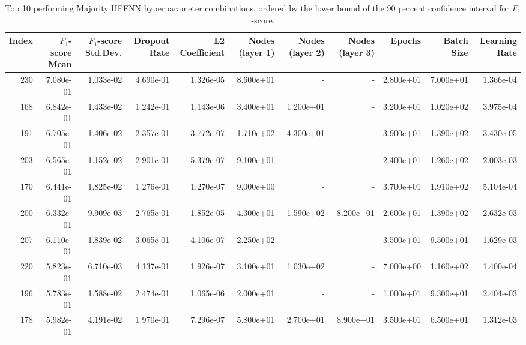 \begin{table}
\caption{Top 10 performing Majority HFFNN hyperparameter combinations, ordered by the lower bound of the 90 percent confidence interval for $F_1$-score.}
\label{tab:appendix_best_majority_hffnn_hpars}
\begin{adjustbox}{width=1\textwidth}
\begin{tabular}{rrrrrrrrrrr}
\toprule
Index & $F_1$-score Mean & $F_1$-score Std.Dev. & Dropout Rate & L2 Coefficient & Nodes (layer 1) & Nodes (layer 2) & Nodes (layer 3) & Epochs & Batch Size & Learning Rate \\
\midrule
230 & 7.080e-01 & 1.033e-02 & 4.690e-01 & 1.326e-05 & 8.600e+01 & - & - & 2.800e+01 & 7.000e+01 & 1.366e-04 \\
168 & 6.842e-01 & 1.433e-02 & 1.242e-01 & 1.143e-06 & 3.400e+01 & 1.200e+01 & - & 3.200e+01 & 1.020e+02 & 3.975e-04 \\
191 & 6.705e-01 & 1.406e-02 & 2.357e-01 & 3.772e-07 & 1.710e+02 & 4.300e+01 & - & 3.900e+01 & 1.390e+02 & 3.430e-05 \\
203 & 6.565e-01 & 1.152e-02 & 2.901e-01 & 5.379e-07 & 9.100e+01 & - & - & 2.400e+01 & 1.260e+02 & 2.003e-03 \\
170 & 6.441e-01 & 1.825e-02 & 1.276e-01 & 1.270e-07 & 9.000e+00 & - & - & 3.700e+01 & 1.910e+02 & 5.104e-04 \\
200 & 6.332e-01 & 9.909e-03 & 2.765e-01 & 1.852e-05 & 4.300e+01 & 1.590e+02 & 8.200e+01 & 2.600e+01 & 1.390e+02 & 2.632e-03 \\
207 & 6.110e-01 & 1.839e-02 & 3.065e-01 & 4.106e-07 & 2.250e+02 & - & - & 3.500e+01 & 9.500e+01 & 1.629e-03 \\
220 & 5.823e-01 & 6.710e-03 & 4.137e-01 & 1.926e-07 & 3.100e+01 & 1.030e+02 & - & 7.000e+00 & 1.160e+02 & 1.400e-04 \\
196 & 5.783e-01 & 1.588e-02 & 2.474e-01 & 1.065e-06 & 2.000e+01 & - & - & 1.000e+01 & 9.300e+01 & 2.404e-03 \\
178 & 5.982e-01 & 4.191e-02 & 1.970e-01 & 7.296e-07 & 5.800e+01 & 2.700e+01 & 8.900e+01 & 3.500e+01 & 6.500e+01 & 1.312e-03 \\
\bottomrule
\end{tabular}
\end{adjustbox}
\end{table}
